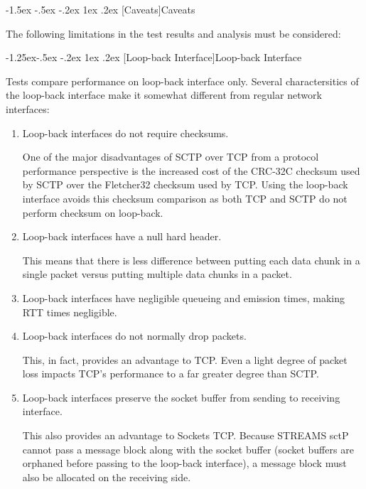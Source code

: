 \documentclass[letterpaper,final,notitlepage,twocolumn,10pt,twoside]{article}
\makeatletter
\renewcommand\subsection{\@startsection{subsection}{2}{\z@}%
                                     {-1.5ex \@plus -.5ex \@minus -.2ex}%
                                     {1ex \@plus .2ex}%
                                     {\normalfont\normalsize\bfseries}}
\renewcommand\subsubsection{\@startsection{subsubsection}{3}{\z@}%
                                     {-1.25ex\@plus -.5ex \@minus -.2ex}%
                                     {1ex \@plus .2ex}%
                                     {\normalfont\normalsize\bfseries}}
\makeatother
\begin{document}
\subsection[Caveats]{Caveats}

The following limitations in the test results and analysis must be considered:


\subsubsection[Loop-back Interface]{Loop-back Interface}

Tests compare performance on loop-back interface only.  Several charactersitics of the loop-back
interface make it somewhat different from regular network interfaces:

\begin{enumerate}

\item Loop-back interfaces do not require checksums.

One of the major disadvantages of SCTP over TCP from a protocol performance perspective is the
increased cost of the CRC-32C checksum used by SCTP over the Fletcher32 checksum used by TCP.  Using
the loop-back interface avoids this checksum comparison as both TCP and SCTP do not perform checksum
on loop-back.

\item Loop-back interfaces have a null hard header.

This means that there is less difference between putting each data chunk in a single packet versus
putting multiple data chunks in a packet.

\item Loop-back interfaces have negligible queueing and emission times, making RTT times negligible.

\item Loop-back interfaces do not normally drop packets.

This, in fact, provides an advantage to TCP.  Even a light degree of packet loss impacts TCP's
performance to a far greater degree than SCTP.

\item Loop-back interfaces preserve the socket buffer from sending to receiving interface.

This also provides an advantage to Sockets TCP.  Because STREAMS sctP cannot pass a message block
along with the socket buffer (socket buffers are orphaned before passing to the loop-back
interface), a message block must also be allocated on the receiving side.

\end{enumerate}
\end{document}
